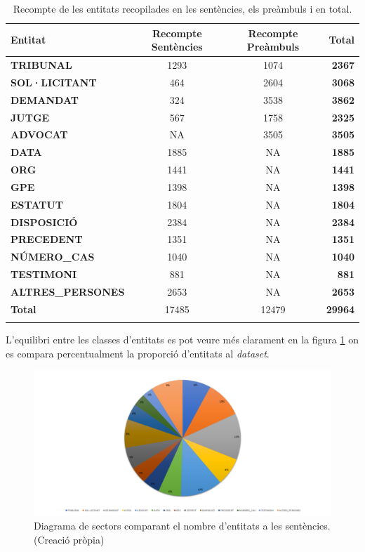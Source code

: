 \begin{table}[H]
    \centering
    \begin{tabular}{lccr}
        \Xhline{2\arrayrulewidth}
        Entitat & Recompte Sentències & Recompte Preàmbuls & Total \\
        \hline
        \textbf{TRIBUNAL} & 1293 & 1074 & \textbf{2367} \\
        \textbf{SOL·LICITANT} & 464 & 2604 & \textbf{3068} \\
        \textbf{DEMANDAT} & 324 & 3538 & \textbf{3862} \\
        \textbf{JUTGE} & 567 & 1758 & \textbf{2325} \\
        \textbf{ADVOCAT} & NA & 3505 & \textbf{3505} \\
        \textbf{DATA} & 1885 & NA & \textbf{1885} \\
        \textbf{ORG} & 1441 & NA & \textbf{1441} \\
        \textbf{GPE} & 1398 & NA & \textbf{1398} \\
        \textbf{ESTATUT} & 1804 & NA & \textbf{1804} \\
        \textbf{DISPOSICIÓ} & 2384 & NA & \textbf{2384} \\
        \textbf{PRECEDENT} & 1351 & NA & \textbf{1351} \\
        \textbf{NÚMERO\_CAS} & 1040 & NA & \textbf{1040} \\
        \textbf{TESTIMONI} & 881 & NA & \textbf{881} \\
        \textbf{ALTRES\_PERSONES} & 2653 & NA & \textbf{2653} \\
        \hline
        \textbf{Total} & 17485 & 12479 & \textbf{29964} \\
        \Xhline{2\arrayrulewidth}
    \end{tabular}
    \caption{Recompte de les entitats recopilades en les sentències, els preàmbuls i en total.}
    \label{tab:recompte_entitats}
\end{table}

L'equilibri entre les classes d'entitats es pot veure més clarament en la figura \ref{fig:diagrama_sectors_tipus_entitats} on es compara percentualment la proporció d'entitats al \textit{dataset}.
\begin{figure}[H]
  \centering
  \includegraphics[width=\textwidth]{formatge_tipus_entitats.png}
  \caption[Diagrama de sectors del nombre d'entitats a les sentències]{Diagrama de sectors comparant el nombre d'entitats a les sentències. \\ (Creació pròpia)}
  \label{fig:diagrama_sectors_tipus_entitats}
\end{figure}

